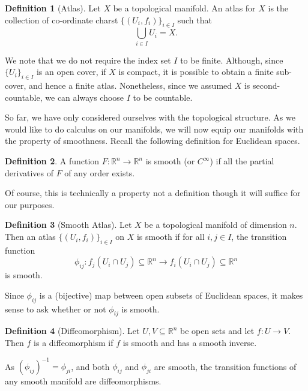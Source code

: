 \documentclass[]{article}
\theoremstyle{definition}
\theoremstyle{definition}
\newtheorem{definition}{Definition}[section]
\begin{document}
\begin{definition}[Atlas]
  Let \(X\) be a topological manifold. An atlas for \(X\) is the collection of
  co-ordinate charst \(\{(U_i, f_i)\}_{i \in I}\) such that 
  \[\bigcup_{i \in I} U_i = X.\]
\end{definition}

We note that we do not require the index set \(I\) to be finite. 
Although, since \(\{U_i\}_{i \in I}\) is an open cover, if \(X\) is compact, 
it is possible to obtain a finite sub-cover, and hence a finite atlas. Nonetheless, 
since we assumed \(X\) is second-countable, we can always choose \(I\) to be 
countable.

So far, we have only considered ourselves with the topological structure. As 
we would like to do calculus on our manifolds, we will now equip our manifolds 
with the property of smoothness. Recall the following definition for Euclidean 
spaces. 

\begin{definition}
  A function \(F : \mathbb{R}^n \to \mathbb{R}^n\) is smooth (or \(C^\infty\)) 
  if all the partial derivatives of \(F\) of any order exists.
\end{definition}

Of course, this is technically a property not a definition though it will suffice 
for our purposes.

\begin{definition}[Smooth Atlas]
  Let \(X\) be a topological manifold of dimension \(n\). Then an atlas 
  \(\{(U_i, f_i)\}_{i \in I}\) on \(X\) is smooth if for all \(i, j \in I\),
  the transition function 
  \[\phi_{ij} : f_j(U_i \cap U_j) \subseteq \mathbb{R}^n \to 
    f_i(U_i \cap U_j) \subseteq \mathbb{R}^n\]
  is smooth.
\end{definition}

Since \(\phi_{ij}\) is a (bijective) map between open subsets of Euclidean 
spaces, it makes sense to ask whether or not \(\phi_{ij}\) is smooth.

\begin{definition}[Diffeomorphism]
  Let \(U, V \subseteq \mathbb{R}^n\) be open sets and let \(f : U \to V\). 
  Then \(f\) is a diffeomorphism if \(f\) is smooth and has a smooth inverse.
\end{definition}

As \((\phi_{ij})^{-1} = \phi_{ji}\), and both \(\phi_{ij}\) and \(\phi_{ji}\) 
are smooth, the transition functions of any smooth manifold are diffeomorphisms.
\end{document}
